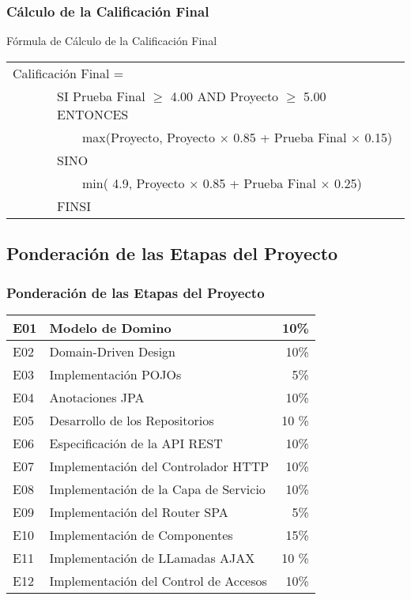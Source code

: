\documentclass[handout,a4paper,t,xcolor=pst,colortheme]{beamer}
\begin{document}
\begin{frame}[c]
	\frametitle{Cálculo de la Calificación Final}
	\begin{block}{Fórmula de Cálculo de la Calificación Final}
		\begin{center}
        \begin{tabular}{ll}
			\multicolumn{2}{l}{Calificación  Final  =}  \\ 
			\ \ \ \ \ & SI Prueba Final $\geq$ 4.00 AND  Proyecto $\geq$ 5.00 ENTONCES \\
			\ \ \ \ \ & \ \ \ \ max(Proyecto, Proyecto $\times$ 0.85 + Prueba Final  $\times$ 0.15) \\
			\ \ \ \ \ & SINO \\
			\ \ \ \ \ & \ \ \ \ min( 4.9, Proyecto $\times$ 0.85 + Prueba Final  $\times$ 0.25) \\					
			\ \ \ \ \ & FINSI   \\
		\end{tabular}
        \end{center}
	\end{block}
\end{frame}

\subsection{Ponderación de las Etapas del Proyecto}

\begin{frame}[c]
    \frametitle{Ponderación de las Etapas del Proyecto}
    \begin{center}
	\begin{tabular}{|ll|r|}
    \hline \hline
	E01 & Modelo de Domino     & 10\% \\ \hline
    E02 & Domain-Driven Design & 10\% \\ \hline	
    E03 & Implementación POJOs &  5\% \\ \hline
    E04 & Anotaciones JPA                     & 10\% \\ \hline
    E05 & Desarrollo de los Repositorios        & 10 \% \\ \hline
    E06 & Especificación de la API REST         & 10\% \\ \hline
    E07 & Implementación del Controlador HTTP   &   10\% \\ \hline
    E08 & Implementación de la Capa de Servicio &  10\% \\ \hline
    E09 & Implementación del Router SPA         & 5\% \\ \hline
    E10 & Implementación de Componentes         & 15\% \\ \hline
    E11 & Implementación de LLamadas AJAX       & 10 \% \\ \hline
    E12 & Implementación del Control de Accesos & 10\% \\
    \hline \hline
	\end{tabular}
    \end{center}
\end{frame}
\end{document}

